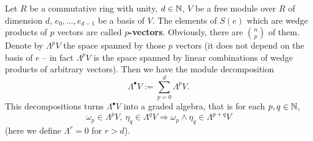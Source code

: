 \begin{remark}
   Let
    $R$ be a commutative ring with unity,
    $d \in \mathbb{N}$,
    $V$ be a free module over $R$ of dimension $d$,
    $e_0, ..., e_{d - 1}$ be a basis of $V$.
  The elements of $S(e)$ which are wedge products of $p$ vectors are called
  \textbf{$p$-vectors}.
  Obviously, there are $\binom{n}{p}$ of them.
  Denote by $\Lambda^p V$ the space spanned by those $p$ vectors
  (it does not depend on the basis of $e$ -- in fact $\Lambda^p V$ is the space
  spanned by linear combinations of wedge products of arbitrary vectors).
  Then we have the module decomposition
  \begin{equation}
    \Lambda^\bullet V := \sum_{p = 0}^d \Lambda^p V.
  \end{equation}
  This decompositions turns $\Lambda^\bullet V$ into a graded algebra, that is
  for each $p, q \in \mathbb{N}$,
  \begin{equation}
    \omega_p \in \Lambda^p V,\ \eta_q \in \Lambda^q V
    \Rightarrow \omega_p \wedge \eta_q \in \Lambda^{p + q} V
  \end{equation}
  (here we define $\Lambda^r = 0$ for $r > d$).
\end{remark}
